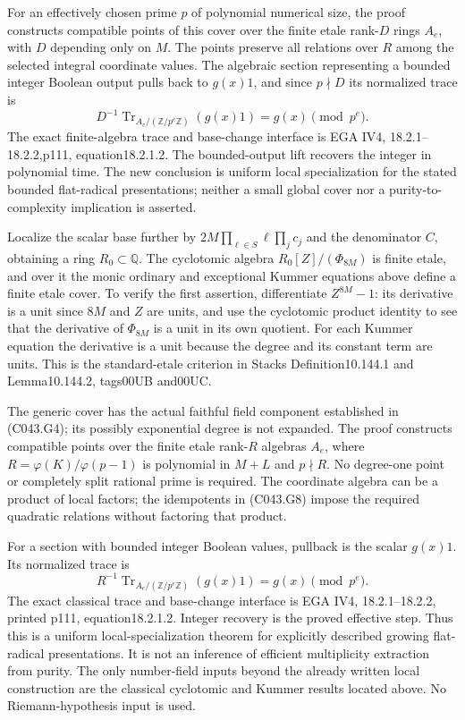 \begin{geometricstatement}[NN-C043]
For an effectively chosen prime $p$ of polynomial numerical size, the
proof constructs compatible points of this cover over the finite etale
rank-$D$ rings $A_e$, with $D$ depending only on $M$. The points preserve
all relations over $R$ among the selected integral coordinate values.
The algebraic section representing a bounded integer Boolean output
pulls back to $g(x)1$, and since $p\nmid D$ its normalized trace is
\[
           D^{-1}\operatorname{Tr}_{A_e/(\mathbb Z/p^e\mathbb Z)}
                         (g(x)1)=g(x)\pmod{p^e}.
\]
The exact finite-algebra trace and base-change interface is EGA IV4,
18.2.1--18.2.2,p111, equation18.2.1.2. The bounded-output lift recovers
the integer in polynomial time. The new conclusion is uniform local
specialization for the stated bounded flat-radical presentations;
neither a small global cover nor a purity-to-complexity implication
is asserted.

Localize the scalar base further by $2M\prod_{\ell\in S}\ell\prod_jc_j$
and the denominator $C$, obtaining a ring $R_0\subset\mathbb Q$.
The cyclotomic algebra $R_0[Z]/(\Phi_{8M})$ is finite etale, and over
it the monic ordinary and exceptional Kummer equations above define
a finite etale cover. To verify the first assertion, differentiate
$Z^{8M}-1$: its derivative is a unit since $8M$ and $Z$ are units,
and use the cyclotomic product identity to see that the derivative
of $\Phi_{8M}$ is a unit in its own quotient. For each Kummer equation
the derivative is a unit because the degree and its constant term
are units. This is the standard-etale criterion in Stacks
Definition10.144.1 and Lemma10.144.2, tags00UB and00UC.

The generic cover has the actual faithful field component established
in (C043.G4); its possibly exponential degree is not expanded. The proof
constructs compatible points over the finite etale rank-$R$ algebras
$A_e$, where $R=\varphi(K)/\varphi(p-1)$ is polynomial in $M+L$ and
$p\nmid R$. No degree-one point or completely split rational prime
is required. The coordinate algebra can be a product of local factors;
the idempotents in (C043.G8) impose the required quadratic relations
without factoring that product.

For a section with bounded integer Boolean values, pullback is the
scalar $g(x)1$. Its normalized trace is
\[
 R^{-1}\operatorname{Tr}_{A_e/(\mathbb Z/p^e\mathbb Z)}(g(x)1)
                         =g(x)\pmod{p^e}.
\]
The exact classical trace and base-change interface is EGA IV4,
18.2.1--18.2.2, printed p111, equation18.2.1.2. Integer recovery is
the proved effective step. Thus this is a uniform local-specialization
theorem for explicitly described growing flat-radical presentations.
It is not an inference of efficient multiplicity extraction from purity.
The only number-field inputs beyond the already written local construction
are the classical cyclotomic and Kummer results located above.
No Riemann-hypothesis input is used.


\end{geometricstatement}
